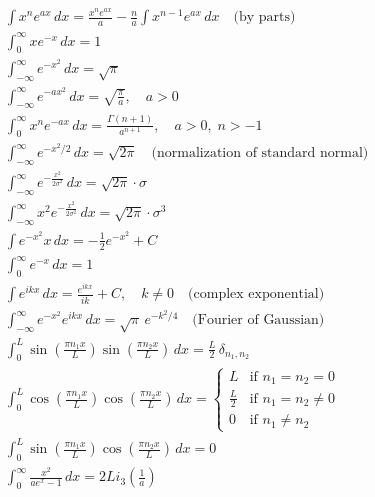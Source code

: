 \begin{cheatformula}[אינטרגרלים]
\begin{align*}
& \int x^n e^{ax} \, dx = \frac{x^n e^{ax}}{a} - \frac{n}{a} \int x^{n-1} e^{ax} \, dx \quad \text{(by parts)} \\[8pt]
& \int_0^\infty x e^{-x} \, dx = 1 \\[8pt]
& \int_{-\infty}^{\infty} e^{-x^2} \, dx = \sqrt{\pi} \\[8pt]
& \int_{-\infty}^{\infty} e^{-a x^2} \, dx = \sqrt{\frac{\pi}{a}}, \quad a > 0 \\[8pt]
& \int_{0}^{\infty} x^{n} e^{-a x} \, dx = \frac{\Gamma(n+1)}{a^{n+1}}, \quad a > 0,\; n > -1 \\[8pt]
& \int_{-\infty}^{\infty} e^{-x^2/2} \, dx = \sqrt{2\pi} \quad \text{(normalization of standard normal)} \\[8pt]
& \int_{-\infty}^{\infty} e^{-\frac{x^2}{2\sigma ^2}} \, dx = \sqrt{2\pi} \cdot \sigma \\[8pt]
& \int_{-\infty}^{\infty} x^2 e^{-\frac{x^2}{2\sigma ^2}} \, dx = \sqrt{2\pi} \cdot \sigma ^3 \\[8pt]
& \int e^{-x^2} x \, dx = -\frac{1}{2} e^{-x^2} + C \\[8pt]
& \int_{0}^{\infty} e^{-x} \, dx = 1 \\[8pt]
& \int e^{i k x} \, dx = \frac{e^{i k x}}{i k} + C, \quad k \neq 0 \quad \text{(complex exponential)} \\[8pt]
& \int_{-\infty}^{\infty} e^{-x^2} e^{i k x} \, dx = \sqrt{\pi} \, e^{-k^2/4} \quad \text{(Fourier of Gaussian)} \\[8pt]
& \int_0^L \sin\left( \frac{\pi n_1 x}{L} \right) \sin\left( \frac{\pi n_2 x}{L} \right) \, dx = \frac{L}{2} \, \delta_{n_1, n_2} \\[8pt]
& \int_0^L \cos\left( \frac{\pi n_1 x}{L} \right) \cos\left( \frac{\pi n_2 x}{L} \right) \, dx = 
\begin{cases}
L & \text{if } n_1 = n_2 = 0 \\
\frac{L}{2} & \text{if } n_1 = n_2 \neq 0 \\
0 & \text{if } n_1 \ne n_2
\end{cases} \\[8pt]
& \int_0^L \sin\left( \frac{\pi n_1 x}{L} \right) \cos\left( \frac{\pi n_2 x}{L} \right) \, dx = 0 \\
& \int_0^\infty \frac{x^2}{ae^x - 1} \, dx = 2 Li_3\left( \frac{1}{a} \right)
\end{align*}

\end{cheatformula}

